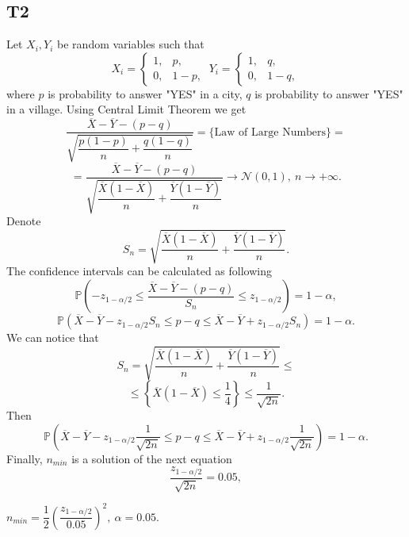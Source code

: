 \documentclass[a4paper, 12pt]{article}
\renewcommand*{\P}{\mathbb{P}}
\begin{document}
\subsection*{T2}
Let $X_i, Y_i$ be random variables such that
$$
X_i = 
\begin{cases}
1, & p,\\
0, & 1- p,
\end{cases}
~
Y_i = 
\begin{cases}
1, & q,\\
0, & 1- q,
\end{cases}
$$
where $p$ is probability to answer "YES" in a city, $q$ is probability to answer "YES" in a village. 
Using Central Limit Theorem we get
$$
\dfrac{\overline{X} - \overline{Y} - (p - q)}{\sqrt{\dfrac{p(1-p)}{n} + \dfrac{q(1-q)}{n}}} = \{ \text{Law of Large Numbers} \} =
$$
$$ 
= \dfrac{\overline{X} - \overline{Y} - (p - q)}{\sqrt{\dfrac{\overline{X}(1-\overline{X})}{n} + \dfrac{\overline{Y}(1-\overline{Y})}{n}}}
\rightarrow \mathcal{N}(0, 1), ~ n \rightarrow + \infty.
$$
Denote 
$$
S_n = \sqrt{\dfrac{\overline{X}(1-\overline{X})}{n} + \dfrac{\overline{Y}(1-\overline{Y})}{n}}.
$$
The confidence intervals can be calculated as following 
$$
\P \left( -z_{1-\alpha /2} \leqslant \dfrac{\overline{X} - \overline{Y} - (p - q)}{S_n} \leqslant z_{1 - \alpha /2} \right) = 1 - \alpha,
$$
$$
\P \left(\overline{X} - \overline{Y} - z_{1 - \alpha/2} S_n \leqslant p - q \leqslant \overline{X} - \overline{Y} + z_{1 - \alpha/2} S_n \right) = 1 - \alpha.
$$
We can notice that 
$$
S_n = \sqrt{\dfrac{\overline{X}(1-\overline{X})}{n} + \dfrac{\overline{Y}(1-\overline{Y})}{n}} \leqslant $$
$$
\leqslant \left \{ \overline{X} (1 - \overline{X}) \leqslant \dfrac{1}{4} \right \} \leqslant \dfrac{1}{\sqrt{2n}}.
$$
Then
$$
\P \left(\overline{X} - \overline{Y} - z_{1 - \alpha/2} \dfrac{1}{\sqrt{2n}} \leqslant p - q \leqslant \overline{X} - \overline{Y} + z_{1 - \alpha/2} \dfrac{1}{\sqrt{2n}} \right) = 1 - \alpha.
$$
Finally, $n_{min}$ is a solution of the next equation
$$
\dfrac{z_{1 - \alpha/2}}{\sqrt{2n}} = 0.05,
$$
\begin{tcolorbox}
[enhanced,width=\textwidth,center upper,
 fontupper=\large\bfseries,
 drop fuzzy shadow southeast,
 colframe=red!50!black,colback=yellow!25]
$
n_{min} = \dfrac{1}{2} \left( \dfrac{z_{1 - \alpha/2}}{0.05} \right)^2, ~ \alpha = 0.05.
$
\end{tcolorbox}
\end{document}
